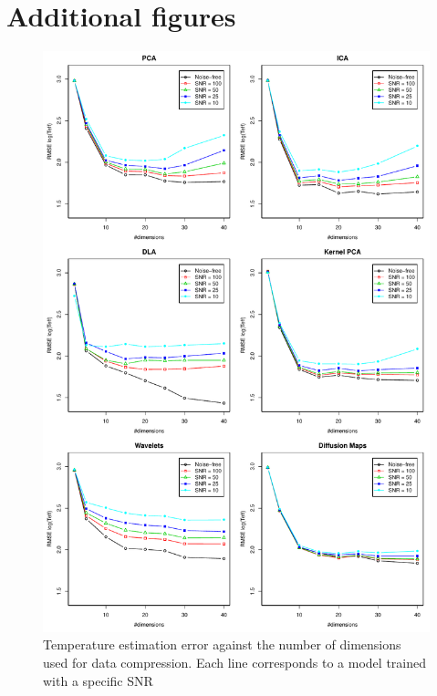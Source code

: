 \documentclass[a4paper,fleqn,usenatbib]{mnras}
\begin{document}
{{{\section{Additional figures}
\label{app}
\begin{figure}
\centering\includegraphics[height=0.95\textheight]{flamesHR10_Teff_log_BestSVM_N-SNR-RMSE_test.pdf}
\caption{Temperature estimation error against the number of dimensions
  used for data compression. Each line corresponds to a model trained
  with a specific SNR}
\label{fig:methodsnrTeff}
\end{figure}

}}}
\end{document}
